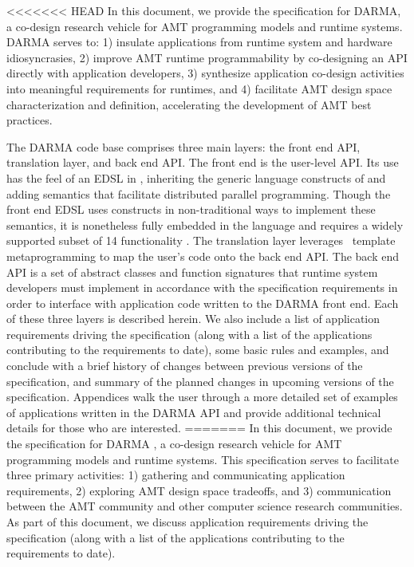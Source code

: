 
<<<<<<< HEAD
In this document, we provide the specification for \gls{DARMA}, 
a co-design research vehicle for \gls{AMT} \glspl{programming model} and
\glspl{runtime system}.  \gls{DARMA} serves to:
1) insulate applications from \gls{runtime system} and hardware idiosyncrasies,
2) improve \gls{AMT} runtime programmability by co-designing an \gls{API} directly with
  application developers, 3) synthesize application \gls{co-design} activities into
  meaningful requirements for runtimes, and 4) 
facilitate \gls{AMT} design space characterization and definition, accelerating the
development of \gls{AMT} best practices.

The \gls{DARMA} code base comprises three main layers: the \gls{front end} \gls{API},
\gls{translation layer}, and \gls{back end} \gls{API}.  
The \gls{front end} is the user-level \gls{API}. 
Its use has the feel of an \gls{EDSL} in \CC,  inheriting the generic
language constructs of \CC and adding \gls{semantics} that facilitate
distributed parallel programming. Though the \gls{front end} \gls{EDSL} uses
\CC constructs in non-traditional ways to implement these semantics, it is
nonetheless fully embedded in the \CC language and
requires a widely supported subset of \CC{}14 functionality \compilerReqs.
The \gls{translation layer} leverages \CC\ \gls{template
metaprogramming} to map the user's code onto the \gls{back end} \gls{API}.
The \gls{back end} \gls{API} is a set of abstract classes and function
signatures that \gls{runtime system} developers must implement in accordance with the
specification requirements in order to interface with application code written
to the \gls{DARMA} front end.  
Each of these three layers is described herein. We also
include a list of application requirements driving the specification (along
with a list of the applications contributing to the requirements to date), some basic rules 
and examples, and conclude with a brief history of changes between previous
versions of the specification, and summary of the planned changes in upcoming
versions of the specification.  Appendices walk the user through a more detailed set
of examples of applications written in the \gls{DARMA} \gls{API} and provide
additional technical details for those who are interested.
=======
In this document, we provide the specification for DARMA 
,
a co-design research vehicle for \gls{AMT} programming models and runtime
systems.  This specification serves to facilitate three primary activities: 
1) gathering and communicating application requirements, 2) exploring AMT
design space tradeoffs, and 3) communication between the AMT community and
other computer science research communities.
As part of this document, we discuss application requirements driving the specification (along
with a list of the applications contributing to the requirements to date).

